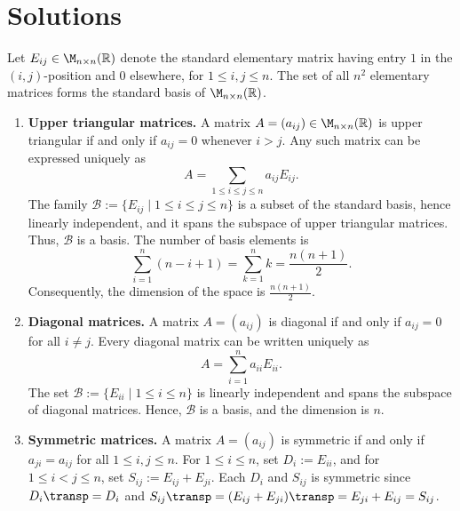\section{Solutions}
\label{sec:solutions_dimension}

\begin{exercisesolution*}
\label{sol:matrix_subspaces_dimension_bases}
Let $E_{ij} \in \M_{n \times n}(\mathbb{R})$ denote the standard elementary matrix having entry $1$ in the $(i, j)$-position and $0$ elsewhere, for $1 \le i, j \le n$. The set of all $n^2$ elementary matrices forms the standard basis of $\M_{n \times n}(\mathbb{R})$.

\begin{enumerate}[label=\textbf{(\alph*)}]
    \item \textbf{Upper triangular matrices.} A matrix $A = (a_{ij}) \in \M_{n \times n}(\mathbb{R})$ is upper triangular if and only if $a_{ij} = 0$ whenever $i > j$. Any such matrix can be expressed uniquely as
    \[
        A = \sum_{1 \le i \le j \le n} a_{ij} E_{ij}.
    \]
    The family $\mathcal{B} := \{E_{ij} \mid 1 \le i \le j \le n\}$ is a subset of the standard basis, hence linearly independent, and it spans the subspace of upper triangular matrices. Thus, $\mathcal{B}$ is a basis. The number of basis elements is
    \[
        \sum_{i=1}^n (n - i + 1) = \sum_{k=1}^n k = \frac{n(n+1)}{2}.
    \]
    Consequently, the dimension of the space is $\frac{n(n+1)}{2}$.

    \item \textbf{Diagonal matrices.} A matrix $A = (a_{ij})$ is diagonal if and only if $a_{ij} = 0$ for all $i \neq j$. Every diagonal matrix can be written uniquely as
    \[
        A = \sum_{i=1}^n a_{ii} E_{ii}.
    \]
    The set $\mathcal{B} := \{E_{ii} \mid 1 \le i \le n\}$ is linearly independent and spans the subspace of diagonal matrices. Hence, $\mathcal{B}$ is a basis, and the dimension is $n$.

    \item \textbf{Symmetric matrices.} A matrix $A = (a_{ij})$ is symmetric if and only if $a_{ji} = a_{ij}$ for all $1 \le i, j \le n$. For $1 \le i \le n$, set $D_i := E_{ii}$, and for $1 \le i < j \le n$, set $S_{ij} := E_{ij} + E_{ji}$. Each $D_i$ and $S_{ij}$ is symmetric since $D_i\transp = D_i$ and $S_{ij}\transp = (E_{ij} + E_{ji})\transp = E_{ji} + E_{ij} = S_{ij}$.
    

\end{enumerate}
\end{exercisesolution*}
